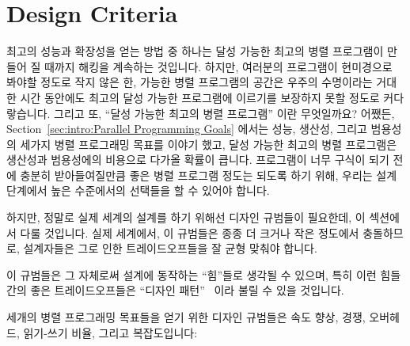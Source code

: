 
\section{Design Criteria}
\label{sec:SMPdesign:Design Criteria}

최고의 성능과 확장성을 얻는 방법 중 하나는 달성 가능한 최고의 병렬 프로그램이
만들어 질 때까지 해킹을 계속하는 것입니다.
하지만, 여러분의 프로그램이 현미경으로 봐야할 정도로 작지 않은 한, 가능한 병렬
프로그램의 공간은 우주의 수명이라는 거대한 시간 동안에도 최고의 달성 가능한
프로그램에 이르기를 보장하지 못할 정도로 커다랗습니다.
그리고 또, ``달성 가능한 최고의 병렬 프로그램'' 이란 무엇일까요?
어쨌든, Section~\ref{sec:intro:Parallel Programming Goals} 에서는 성능, 생산성,
그리고 범용성의 세가지 병렬 프로그래밍 목표를 이야기 했고, 달성 가능한 최고의
병렬 프로그램은 생산성과 범용성에의 비용으로 다가올 확률이 큽니다.
프로그램이 너무 구식이 되기 전에 충분히 받아들여질만큼 좋은 병렬 프로그램
정도는 되도록 하기 위해, 우리는 설계 단계에서 높은 수준에서의 선택들을 할 수
있어야 합니다.
\iffalse

One way to obtain the best performance and scalability is to simply
hack away until you converge on the best possible parallel program.
Unfortunately, if your program is other than microscopically tiny,
the space of possible parallel programs is so huge
that convergence is not guaranteed in the lifetime of the universe.
Besides, what exactly is the ``best possible parallel program''?
After all, Section~\ref{sec:intro:Parallel Programming Goals}
called out no fewer than three parallel-programming goals of
performance, productivity, and generality,
and the best possible performance will likely come at a cost in
terms of productivity and generality.
We clearly need to be able to make higher-level choices at design
time in order to arrive at an acceptably good parallel program
before that program becomes obsolete.
\fi

하지만, 정말로 실제 세계의 설계를 하기 위해선 디자인 규범들이 필요한데, 이
섹션에서 다룰 것입니다.
실제 세계에서, 이 규범들은 종종 더 크거나 작은 정도에서 충돌하므로, 설계자들은
그로 인한 트레이드오프들을 잘 균형 맞춰야 합니다.

이 규범들은 그 자체로써 설계에 동작하는 ``힘''들로 생각될 수 있으며, 특히 이런
힘들 간의 좋은 트레이드오프들은 ``디자인 패턴''~\cite{Alexander79,GOF95} 이라
불릴 수 있을 것입니다.

세개의 병렬 프로그래밍 목표들을 얻기 위한 디자인 규범들은 속도 향상, 경쟁,
오버헤드, 읽기-쓰기 비율, 그리고 복잡도입니다:
\iffalse

